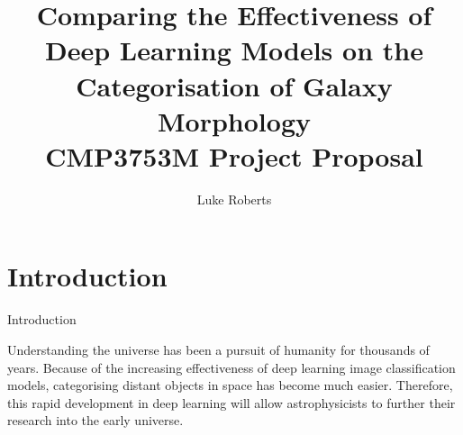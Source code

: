 \documentclass[runningheads]{llncs}
\begin{document}
\title{
    Comparing the Effectiveness of Deep Learning Models on the Categorisation of
    Galaxy Morphology \\ CMP3753M Project Proposal
}

\author{Luke Roberts}


\maketitle

\section{Introduction}
%
%
%
%
%

Introduction

Understanding the universe has been a pursuit of humanity for thousands of
years. Because of the increasing effectiveness of deep learning image
classification models, categorising distant objects in space has become much
easier. Therefore, this rapid development in deep learning will allow
astrophysicists to further their research into the early universe.
\end{document}
